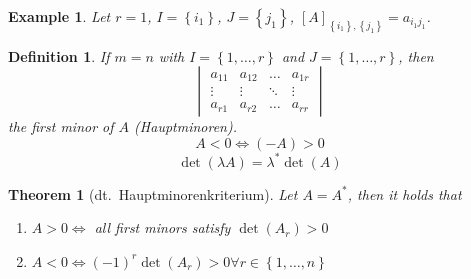 \documentclass[a4paper]{article}
\newcounter{lecref}[section]
\numberwithin{lecref}{section}
\newtheorem{theorem}[lecref]{Theorem}
\newtheorem*{Example}{Example}
\newtheorem{definition}[lecref]{Definition}
\newcommand{\set}[1]{\left\{#1\right\}}
\begin{document}
\begin{Example}
  Let $r = 1$, $I = \set{i_1}$, $J = \set{j_1}$, $[A]_{\set{i_1}, \set{j_1}}  = a_{i_1 j_1}$.
\end{Example}

\begin{definition}
  If $m=n$ with $I = \set{1, \ldots, r}$ and $J = \set{1, \ldots, r}$, then
  \[
    \begin{vmatrix}
      a_{11} & a_{12} & \ldots & a_{1r} \\
      \vdots & \vdots & \ddots & \vdots \\
      a_{r1} & a_{r2} & \ldots & a_{rr}
    \end{vmatrix}
  \]
  the first minor of $A$ (\foreignlanguage{german}{Hauptminoren}).
  \[ A < 0 \iff (-A) > 0 \]
  \[ \det(\lambda A) = \lambda^* \det(A) \]
\end{definition}

\begin{theorem}[dt.~\foreignlanguage{german}{Hauptminorenkriterium}] %
  Let $A = A^*$, then it holds that
  \begin{enumerate}
    \item $A > 0 \iff$ all first minors satisfy $\det(A_r) > 0$
    \item $A < 0 \iff (-1)^r \det(A_r) > 0 \forall r \in \set{1, \ldots, n}$
  \end{enumerate}
\end{theorem}
\end{document}
